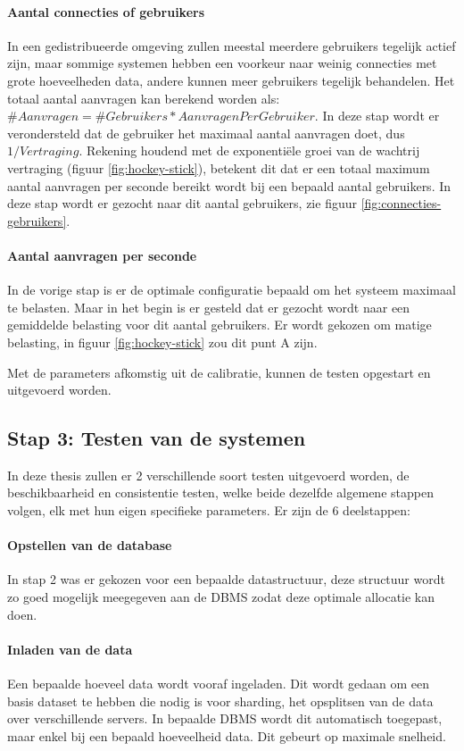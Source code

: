 \paragraph{Aantal connecties of gebruikers} In een gedistribueerde omgeving zullen meestal meerdere gebruikers tegelijk actief zijn, maar sommige systemen hebben een voorkeur naar weinig connecties met grote hoeveelheden data, andere kunnen meer gebruikers tegelijk behandelen. Het totaal aantal aanvragen kan berekend worden als: $\#Aanvragen = \#Gebruikers * AanvragenPerGebruiker$. In deze stap wordt er verondersteld dat de gebruiker het maximaal aantal aanvragen doet, dus $1/Vertraging$. Rekening houdend met de exponentiële groei van de wachtrij vertraging (figuur \ref{fig:hockey-stick}), betekent dit dat er een totaal maximum aantal aanvragen per seconde bereikt wordt bij een bepaald aantal gebruikers. In deze stap wordt er gezocht naar dit aantal gebruikers, zie figuur \ref{fig:connecties-gebruikers}. 

\paragraph{Aantal aanvragen per seconde} In de vorige stap is er de optimale configuratie bepaald om het systeem maximaal te belasten. Maar in het begin is er gesteld dat er gezocht wordt naar een gemiddelde belasting voor dit aantal gebruikers. Er wordt gekozen om matige belasting, in figuur \ref{fig:hockey-stick} zou dit punt A zijn. 

Met de parameters afkomstig uit de calibratie, kunnen de testen opgestart en uitgevoerd worden. 

\subsection*{Stap 3: Testen van de systemen}
In deze thesis zullen er 2 verschillende soort testen uitgevoerd worden, de beschikbaarheid en consistentie testen, welke beide dezelfde algemene stappen volgen, elk met hun eigen specifieke parameters. Er zijn de 6 deelstappen: 

\paragraph{Opstellen van de database} In stap 2 was er gekozen voor een bepaalde datastructuur, deze structuur wordt zo goed mogelijk meegegeven aan de DBMS zodat deze optimale allocatie kan doen.

\paragraph{Inladen van de data} Een bepaalde hoeveel data wordt vooraf ingeladen. Dit wordt gedaan om een basis dataset te hebben die nodig is voor sharding, het opsplitsen van de data over verschillende servers. In bepaalde DBMS wordt dit automatisch toegepast, maar enkel bij een bepaald hoeveelheid data. Dit gebeurt op maximale snelheid. 

